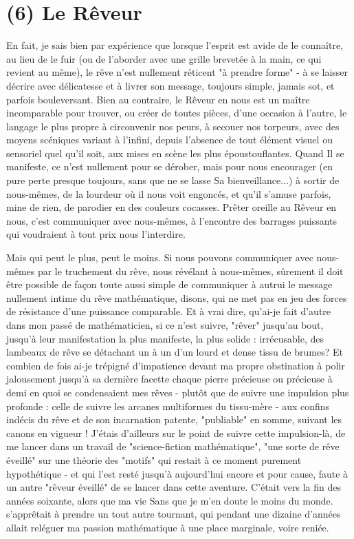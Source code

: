 \section{(6) Le Rêveur}

En fait, je sais bien par expérience que lorsque l'esprit est avide de le connaître, au lieu de le fuir (ou de l'aborder avec une grille brevetée à la main, ce qui revient au même), le rêve n'est nullement réticent "à prendre forme" - à se laisser décrire avec délicatesse et à livrer son message, toujours simple, jamais sot, et parfois bouleversant. Bien au contraire, le Rêveur en nous est un maître incomparable pour trouver, ou créer de toutes pièces, d'une occasion à l'autre, le langage le plus propre à circonvenir nos peurs, à secouer nos torpeurs, avec des moyens scéniques variant à l'infini, depuis l'absence de tout élément visuel ou sensoriel quel qu'il soit, aux mises en scène les plus époustouflantes. Quand Il se manifeste, ce n'est nullement pour se dérober, mais pour nous encourager (en pure perte presque toujours, sans que ne se lasse Sa bienveillance...) à sortir de nous-mêmes, de la lourdeur où il nous voit engoncés, et qu'il s'amuse parfois, mine de rien, de parodier en des couleurs cocasses. Prêter oreille au Rêveur en nous, c'est communiquer avec nous-mêmes, à l'encontre des barrages puissants qui voudraient à tout prix nous l'interdire.

Mais qui peut le plus, peut le moins. Si nous pouvons communiquer avec nous-mêmes par le truchement du rêve, nous révélant à nous-mêmes, sûrement il doit être possible de façon toute aussi simple de communiquer à autrui le message nullement intime du rêve mathématique, disons, qui ne met pas en jeu des forces de résistance d'une puissance comparable. Et à vrai dire, qu'ai-je fait d'autre dans mon passé de mathématicien, si ce n'est suivre, "rêver" jusqu'au bout, jusqu'à leur manifestation la plus manifeste, la plus solide : irrécusable, des lambeaux de rêve se détachant un à un d'un lourd et dense tissu de brumes? Et combien de fois ai-je trépigné d'impatience devant ma propre obstination à polir jalousement jusqu'à sa dernière facette chaque pierre précieuse ou précieuse à demi en quoi se condensaient mes rêves - plutôt que de suivre une impulsion plus profonde : celle de suivre les arcanes multiformes du tissu-mère - aux confins indécis du rêve et de son incarnation patente, "publiable" en somme, suivant les canons en vigueur ! J'étais d'ailleurs sur le point de suivre cette impulsion-là, de me lancer dans un travail de "science-fiction mathématique", "une sorte de rêve éveillé" sur une théorie des "motifs" qui restait à ce moment purement hypothétique - et qui l'est resté jusqu'à aujourd'hui encore et pour cause, faute à un autre "rêveur éveillé" de se lancer dans cette aventure. C'était vers la fin des années soixante, alors que ma vie {Sans que je m'en doute le moins du monde.} s'apprêtait à prendre un tout autre tournant, qui pendant une dizaine d'années allait reléguer ma passion mathématique à une place marginale, voire reniée.

